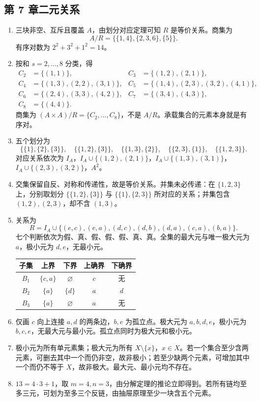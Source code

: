 \documentclass[UTF8,fontset=none,zihao=-4,a4paper]{ctexart}
\begin{document}
\subsection*{第 7 章\quad 二元关系}
\begin{enumerate}[label=7.\arabic*.,leftmargin=2.8em]
\item 三块非空、互斥且覆盖 $A$，由划分对应定理可知 $R$ 是等价关系。商集为
\[
A/R=\bigl\{\{1,4\},\{2,3,6\},\{5\}\bigr\}.
\]
有序对数为 $2^2+3^2+1^2=14$。

\item 按和 $s=2,\ldots,8$ 分类，得
\begin{align*}
C_2&=\{(1,1)\},&C_3&=\{(1,2),(2,1)\},\\
C_4&=\{(1,3),(2,2),(3,1)\},&C_5&=\{(1,4),(2,3),(3,2),(4,1)\},\\
C_6&=\{(2,4),(3,3),(4,2)\},&C_7&=\{(3,4),(4,3)\},\\
C_8&=\{(4,4)\}.&&
\end{align*}
商集为 $(A\times A)/R=\{C_2,\ldots,C_8\}$，不是 $A/R$。承载集合的元素本身就是有序对。

\item 五个划分为
\[
\{\{1\},\{2\},\{3\}\},\quad\{\{1,2\},\{3\}\},\quad
\{\{1,3\},\{2\}\},\quad\{\{2,3\},\{1\}\},\quad\{\{1,2,3\}\}.
\]
对应关系依次为 $I_A$，$I_A\cup\{(1,2),(2,1)\}$，$I_A\cup\{(1,3),(3,1)\}$，$I_A\cup\{(2,3),(3,2)\}$，$A^2$。

\item 交集保留自反、对称和传递性，故是等价关系。并集未必传递：在 $\{1,2,3\}$ 上，分别取划分 $\{\{1,2\},\{3\}\}$ 与 $\{\{1\},\{2,3\}\}$ 所对应的关系；并集包含 $(1,2),(2,3)$，却不含 $(1,3)$。

\item 关系为
\[
R=I_A\cup\{(e,c),(e,a),(d,c),(d,b),(d,a),(c,a),(b,a)\}.
\]
七个判断依次为假、真、假、假、假、真、真。全集的最大元与唯一极大元为 $a$，极小元为 $d,e$，无最小元。
\begin{center}\small
\begin{tabular}{c c c c c}
\toprule 子集 & 上界 & 下界 & 上确界 & 下确界\\\midrule
$B_1$ & $\{c,a\}$ & $\varnothing$ & $c$ & 无\\
$B_2$ & $\{a\}$ & $\{d\}$ & $a$ & $d$\\
$B_3$ & $\{a\}$ & $\varnothing$ & $a$ & 无\\\bottomrule
\end{tabular}
\end{center}

\item 仅画 $c$ 向上连接 $a,d$ 的两条边，$b,e$ 为孤立点。极大元为 $a,b,d,e$，极小元为 $b,c,e$，无最大元与最小元。孤立点同时为极大元和极小元。

\item 极小元为所有单元素集；极大元为所有 $X\setminus\{x\}$，$x\in X$。若一个集合至少含两元素，可删去其中一个而仍非空，故非极小；若至少缺两个元素，可增加其中一个而仍不等于 $X$，故非极大。最大元、最小元均不存在。

\item $13=4\cdot3+1$，取 $m=4,n=3$，由分解定理的推论立即得到。若所有链均至多三元，可划为至多三个反链，由抽屉原理至少一块含五个元素。
\end{enumerate}
\end{document}
